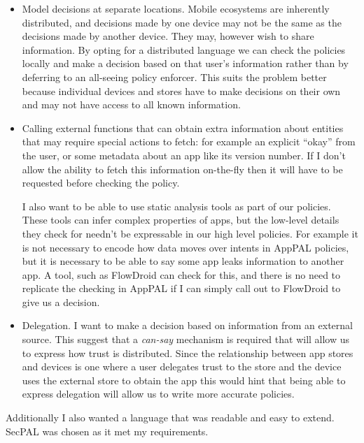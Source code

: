 \documentclass[thesis.tex]{subfiles}
\begin{document}
\begin{itemize}
  \item Model decisions at separate locations.  Mobile ecosystems are
    inherently distributed, and decisions made by one device may not be
    the same as the decisions made by another device.  They may, however
    wish to share information.  By opting for a distributed language we
    can check the policies locally and make a decision based on that
    user's information rather than by deferring to an all-seeing policy
    enforcer.  This suits the problem better because individual devices
    and stores have to make decisions on their own and may not have access
    to all known information.

  \item Calling external functions that can obtain extra information
    about entities that may require special actions to fetch: for example
    an explicit ``okay'' from the user, or some metadata about an app like
    its version number.  If I don't allow the ability to fetch this
    information on-the-fly then it will have to be requested before
    checking the policy. 

    I also want to be able to use static analysis tools as part of
    our policies.  These tools can infer complex properties of apps, but
    the low-level details they check for needn't be expressable in our
    high level policies.  For example it is not necessary to encode how
    data moves over intents in AppPAL policies, but it is necessary to be
    able to say some app leaks information to another app.  A tool, such
    as FlowDroid can check for this, and there is no need to replicate the
    checking in AppPAL if I can simply call out to FlowDroid to give us a
    decision.

  \item Delegation.  I want to make a decision based on information from an
    external source.  This suggest that a \emph{can-say} mechanism is required
    that will allow us to express how trust is distributed.   Since the
    relationship between app stores and devices is one where a user delegates
    trust to the store and the device uses the external store to obtain the app
    this would hint that being able to express delegation will allow us to write
    more accurate policies.
\end{itemize}

Additionally I also wanted a language that was readable and easy to extend.
SecPAL was chosen as it met my requirements.
\end{document}

